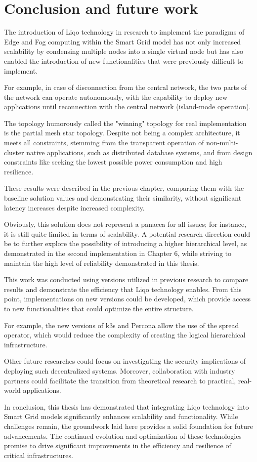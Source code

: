 \chapter{Conclusion and future work}
The introduction of Liqo technology in research to implement the paradigms of Edge and Fog computing within the Smart Grid model has not only increased scalability by condensing multiple nodes into a single virtual node but has also enabled the introduction of new functionalities that were previously difficult to implement.

For example, in case of disconnection from the central network, the two parts of the network can operate autonomously, with the capability to deploy new applications until reconnection with the central network (island-mode operation).

The topology humorously called the "winning" topology for real implementation is the partial mesh star topology. Despite not being a complex architecture, it meets all constraints, stemming from the transparent operation of non-multi-cluster native applications, such as distributed database systems, and from design constraints like seeking the lowest possible power consumption and high resilience.

These results were described in the previous chapter, comparing them with the baseline solution values and demonstrating their similarity, without significant latency increases despite increased complexity.

Obviously, this solution does not represent a panacea for all issues; for instance, it is still quite limited in terms of scalability. A potential research direction could be to further explore the possibility of introducing a higher hierarchical level, as demonstrated in the second implementation in Chapter 6, while striving to maintain the high level of reliability demonstrated in this thesis.

This work was conducted using versions utilized in previous research to compare results and demonstrate the efficiency that Liqo technology enables. From this point, implementations on new versions could be developed, which provide access to new functionalities that could optimize the entire structure.

For example, the new versions of k3s and Percona allow the use of the spread operator, which would reduce the complexity of creating the logical hierarchical infrastructure.

Other future researches could focus on investigating the security implications of deploying such decentralized systems. Moreover, collaboration with industry partners could facilitate the transition from theoretical research to practical, real-world applications.

In conclusion, this thesis has demonstrated that integrating Liqo technology into Smart Grid models significantly enhances scalability and functionality. While challenges remain, the groundwork laid here provides a solid foundation for future advancements. The continued evolution and optimization of these technologies promise to drive significant improvements in the efficiency and resilience of critical infrastructures.




